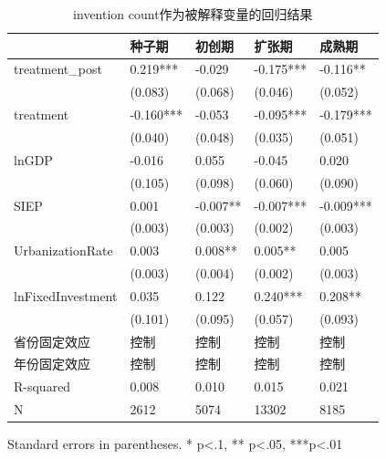 \begin{table}
\caption{invention count作为被解释变量的回归结果}
\label{}
\begin{center}
\begin{tabular}{lllll}
\hline
                  & 种子期       & 初创期      & 扩张期       & 成熟期        \\
\hline
treatment\_post   & 0.219***  & -0.029   & -0.175*** & -0.116**   \\
                  & (0.083)   & (0.068)  & (0.046)   & (0.052)    \\
treatment         & -0.160*** & -0.053   & -0.095*** & -0.179***  \\
                  & (0.040)   & (0.048)  & (0.035)   & (0.051)    \\
lnGDP             & -0.016    & 0.055    & -0.045    & 0.020      \\
                  & (0.105)   & (0.098)  & (0.060)   & (0.090)    \\
SIEP            & 0.001     & -0.007** & -0.007*** & -0.009***  \\
                  & (0.003)   & (0.003)  & (0.002)   & (0.003)    \\
UrbanizationRate              & 0.003     & 0.008**  & 0.005**   & 0.005      \\
                  & (0.003)   & (0.004)  & (0.002)   & (0.003)    \\
lnFixedInvestment & 0.035     & 0.122    & 0.240***  & 0.208**    \\
                  & (0.101)   & (0.095)  & (0.057)   & (0.093)    \\
省份固定效应  & 控制 & 控制 & 控制 & 控制  \\ 
 年份固定效应  & 控制 & 控制 & 控制 & 控制  \\ 
\hline

R-squared         & 0.008     & 0.010    & 0.015     & 0.021      \\
N                 & 2612      & 5074     & 13302     & 8185       \\
\hline
\end{tabular}
\end{center}
\end{table}
\bigskip
Standard errors in parentheses. \newline 
* p<.1, ** p<.05, ***p<.01

